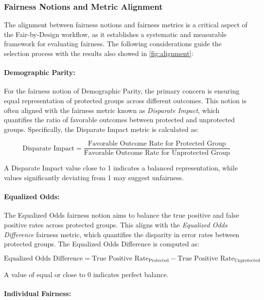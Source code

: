 \subsubsection{Fairness Notions and Metric Alignment}
\label{subsub:alignment}

The alignment between fairness notions and fairness metrics is a critical aspect of the Fair-by-Design workflow, as it establishes a systematic and measurable framework for evaluating fairness. The following considerations guide the selection process with the results also showed in \cref{fig:alignment}:

\paragraph{Demographic Parity:}

For the fairness notion of Demographic Parity, the primary concern is ensuring equal representation of protected groups across different outcomes. This notion is often aligned with the fairness metric known as \emph{Disparate Impact}, which quantifies the ratio of favorable outcomes between protected and unprotected groups. Specifically, the Disparate Impact metric is calculated as:

\[
\text{Disparate Impact} = \frac{\text{Favorable Outcome Rate for Protected Group}}{\text{Favorable Outcome Rate for Unprotected Group}}
\]

A Disparate Impact value close to 1 indicates a balanced representation, while values significantly deviating from 1 may suggest unfairness.

\paragraph{Equalized Odds:}

The Equalized Odds fairness notion aims to balance the true positive and false positive rates across protected groups. This aligns with the \emph{Equalized Odds Difference} fairness metric, which quantifies the disparity in error rates between protected groups. The Equalized Odds Difference is computed as:

\[
\text{Equalized Odds Difference} = \text{True Positive Rate}_{\text{Protected}} - \text{True Positive Rate}_{\text{Unprotected}}
\]

A value of equal or close to 0 indicates perfect balance.

\paragraph{Individual Fairness:}

